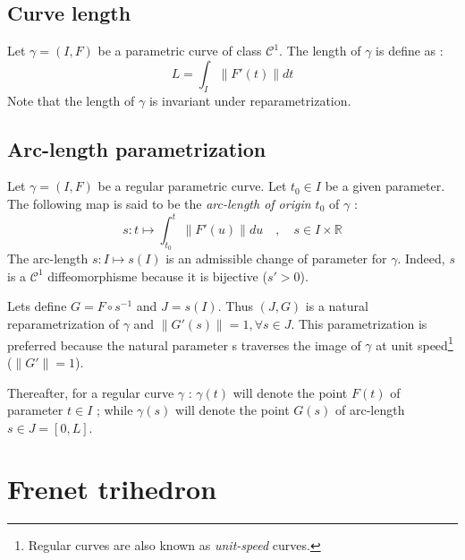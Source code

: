\subsection{Curve length}
Let $\gamma=(I,F)$ be a parametric curve of class ${\mathcal{C}}^{1}$. The length of $\gamma$ is define as :
\begin{equation}
	L=\int_{I}\|F'(t)\|dt
\end{equation}
Note that the length of $\gamma$ is invariant under reparametrization.

\subsection{Arc-length parametrization}
Let $\gamma=(I,F)$ be a regular parametric curve. Let $t_0 \in I$ be a given parameter. The following map is said to be the \emph{arc-length of origin $t_0$} of $\gamma$ :
\begin{equation}
	s \colon t \mapsto \int_{t_{0}}^{t}\|F'(u)\|du
	\quad,\quad
	s \in I \times \mathbb{R}
\end{equation}
The arc-length $s \colon I\mapsto s(I)$ is an admissible change of parameter for $\gamma$. Indeed, $s$ is a ${\mathcal{C}}^{1}$ diffeomorphisme because it is bijective ($s'>0$).

Lets define $G=F\circ s^{-1}$ and $J=s(I)$. Thus $(J,G)$ is a natural reparametrization of $\gamma$ and  $\|G'(s)\| = 1, \forall s \in J$. This parametrization is preferred because the natural parameter s traverses the image of $\gamma$ at unit speed\footnote{Regular curves are also known as \emph{unit-speed} curves.} ($\|G'\| = 1$).

Thereafter, for a regular curve $\gamma$ : $\gamma(t)$ will denote the point $F(t)$ of parameter $t \in I$ ; while $\gamma(s)$ will denote the point $G(s)$ of arc-length $s \in J=[0,L]$.


\section{Frenet trihedron}\label{sec:frenettrihedron}


